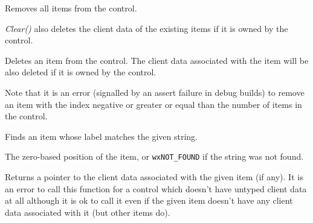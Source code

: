 Removes all items from the control.

{\it Clear()} also deletes the client data of the existing items if it is owned
by the control.

\label{wxcontrolwithitemsdelete}


Deletes an item from the control. The client data associated with the item
will be also deleted if it is owned by the control.

Note that it is an error (signalled by an assert failure in debug builds) to
remove an item with the index negative or greater or equal than the number of
items in the control.





\label{wxcontrolwithitemsfindstring}


Finds an item whose label matches the given string.





The zero-based position of the item, or {\tt wxNOT\_FOUND} if the string was
not found.


\label{wxcontrolwithitemsgetclientdata}


Returns a pointer to the client data associated with the given item (if any).
It is an error to call this function for a control which doesn't have untyped
client data at all although it is ok to call it even if the given item doesn't
have any client data associated with it (but other items do).



